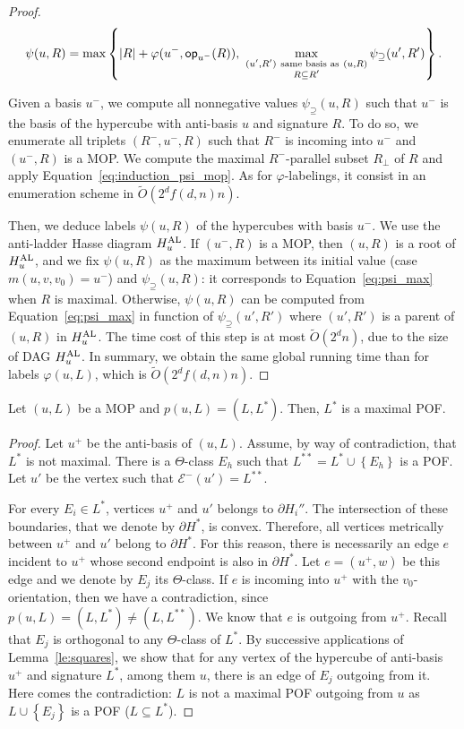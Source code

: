 \documentclass[a4paper,UKenglish,numberwithinsect,cleveref, autoref]{lipics-v2021}
\newcommand{\set}[1]{\left\{ #1 \right\}}
\newcommand{\card}[1]{\left| #1 \right|}
\newcommand{\opp}{\mbox{\textsf{op}}}
\newcommand{\hual}{H_u^{\mbox{\scriptsize{AL}}}}
\newcommand{\psis}{\psi_{\supseteq}}
\begin{document}
\begin{proof}
\begin{equation}
    \psi(u,R) = \max \set{\card{R} + \varphi(u^-,\opp_{u^-}(R)),~ \max\limits_{\substack{(u',R') ~\mbox{\scriptsize{same basis as}}~ (u,R) \\ R \subseteq R'}} \psis(u',R')}.
    \label{eq:psi_max}
\end{equation}

Given a basis $u^-$, we compute all nonnegative values $\psis(u,R)$ such that $u^-$ is the basis of the hypercube with anti-basis $u$ and signature $R$. To do so, we enumerate all triplets $(R^-,u^-,R)$ such that $R^-$ is incoming into $u^-$ and $(u^-,R)$ is a MOP. We compute the maximal $R^-$-parallel subset $R_{\perp}$ of $R$ and apply Equation~\eqref{eq:induction_psi_mop}. As for $\varphi$-labelings, it consist in an enumeration scheme in $\tilde{O}(2^df(d,n)n)$.

Then, we deduce labels $\psi(u,R)$ of the hypercubes with basis $u^-$. We use the anti-ladder Hasse diagram $\hual$. If $(u^-,R)$ is a MOP, then $(u,R)$ is a root of $\hual$, and we fix $\psi(u,R)$ as the maximum between its initial value (case $m(u,v,v_0) = u^-$) and $\psis(u,R)$: it corresponds to Equation~\eqref{eq:psi_max} when $R$ is maximal. Otherwise, $\psi(u,R)$ can be computed from Equation~\eqref{eq:psi_max} in function of $\psis(u',R')$ where $(u',R')$ is a parent of $(u,R)$ in $\hual$. The time cost of this step is at most $\tilde{O}(2^dn)$, due to the size of DAG $\hual$. In summary, we obtain the same global running time than for labels $\varphi(u,L)$, which is $\tilde{O}(2^df(d,n)n)$.
\end{proof}

\begin{lemma}
Let $(u,L)$ be a MOP and $p(u,L) = (L,L^*)$. Then, $L^*$ is a maximal POF.
\label{le:mop_max_subsets}
\end{lemma}
\begin{proof}
Let $u^+$ be the anti-basis of $(u,L)$. 
Assume, by way of contradiction, that $L^*$ is not maximal. There is a $\Theta$-class $E_h$ such that $L^{**} = L^* \cup \set{E_h}$ is a POF. Let $u'$ be the vertex such that $\mathcal{E}^-(u') = L^{**}$.

For every $E_i \in L^*$, vertices $u^+$ and $u'$ belongs to $\partial H_i''$. The intersection of these boundaries, that we denote by $\partial H^*$, is convex. Therefore, all vertices metrically between $u^+$ and $u'$ belong to $\partial H^*$. For this reason, there is necessarily an edge $e$ incident to $u^+$ whose second endpoint is also in $\partial H^*$. Let $e=(u^+,w)$ be this edge and we denote by $E_j$ its $\Theta$-class. If $e$ is incoming into $u^+$ with the $v_0$-orientation, then we have a contradiction, since $p(u,L) = (L,L^*) \neq (L,L^{**})$. We know that $e$ is outgoing from $u^+$. Recall that $E_j$ is orthogonal to any $\Theta$-class of $L^*$. By successive applications of Lemma~\ref{le:squares}, we show that for any vertex of the hypercube of anti-basis $u^+$ and signature $L^*$, among them $u$, there is an edge of $E_j$ outgoing from it. Here comes the contradiction: $L$ is not a maximal POF outgoing from $u$ as $L \cup \set{E_j}$ is a POF ($L \subseteq L^*$).
\end{proof}
\end{document}
